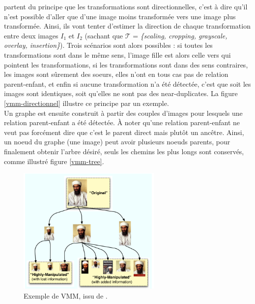 \documentclass[utf8,final]{stageM2R} %
\begin{document}
 partent du principe que les transformations sont directionnelles, c'est à dire qu'il n'est possible d'aller que d'une image moins transformée vers une image plus transformée. Ainsi, ils vont tenter d'estimer la direction de chaque transformation entre deux images $I_{1}$ et $I_{2}$ (sachant que $\mathcal{T}$ = \textit{\{scaling, cropping, grayscale, overlay, insertion\}}). Trois scénarios sont alors possibles : si toutes les transformations sont dans le même sens, l'image fille est alors celle vers qui pointent les transformations, si les transformations sont dans des sens contraires, les images sont sûrement des soeurs, elles n'ont en tous cas pas de relation parent-enfant, et enfin si aucune transformation n'a été détectée, c'est que soit les images sont identiques, soit qu'elles ne sont pas des near-duplicates. La figure \ref{vmm-directionnel} illustre ce principe par un exemple.
\\ \indent
Un graphe est ensuite construit à partir des couples d'images pour lesquels une relation parent-enfant a été détectée. À noter qu'une relation parent-enfant ne veut pas forcément dire que c'est le parent direct mais plutôt un ancêtre. Ainsi, un noeud du graphe (une image) peut avoir plusieurs noeuds parents, pour finalement obtenir l'arbre désiré, seuls les chemins les plus longs sont conservés, comme illustré figure \ref{vmm-tree}.

\begin{figure}
  \begin{center}
    \includegraphics[width=70mm]{images/vmm.png}
    \caption{Exemple de VMM, issu de \autocite{kennedy2008internet}.}
    \label{vmm}
  \end{center}
\end{figure}
\end{document}
